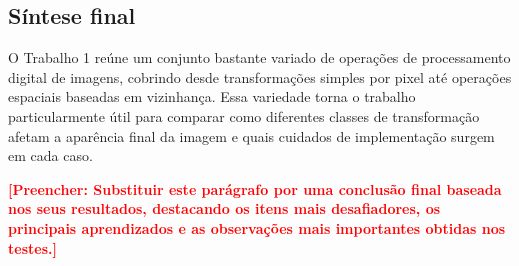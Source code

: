 \documentclass[12pt,a4paper]{article}
\newcommand{\placeholder}[1]{\textcolor{red}{\textbf{[Preencher: #1]}}}
\begin{document}
\subsection{Síntese final}

O Trabalho 1 reúne um conjunto bastante variado de operações de processamento digital de imagens, cobrindo desde transformações simples por pixel até operações espaciais baseadas em vizinhança. Essa variedade torna o trabalho particularmente útil para comparar como diferentes classes de transformação afetam a aparência final da imagem e quais cuidados de implementação surgem em cada caso.

\placeholder{Substituir este parágrafo por uma conclusão final baseada nos seus resultados, destacando os itens mais desafiadores, os principais aprendizados e as observações mais importantes obtidas nos testes.}
\end{document}
